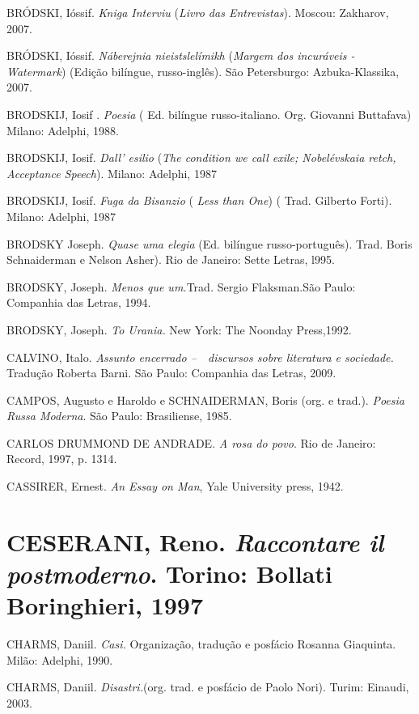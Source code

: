 BRÓDSKI, Ióssif. \emph{Kniga Interviu} (\emph{Livro das Entrevistas}).
Moscou: Zakharov, 2007.

BRÓDSKI, Ióssif. \emph{Náberejnia nieistslelímikh} (\emph{Margem dos
incuráveis - Watermark}) (Edição bilíngue, russo-inglês). São
Petersburgo: Azbuka-Klassika, 2007.

BRODSKIJ, Iosif . \emph{Poesia} ( Ed. bilíngue russo-italiano. Org.
Giovanni Buttafava) Milano: Adelphi, 1988.

BRODSKIJ, Iosif. \emph{Dall' esilio} (\emph{The condition we call exile;
Nobelévskaia retch, Acceptance Speech}). Milano: Adelphi, 1987

BRODSKIJ, Iosif. \emph{Fuga da Bisanzio} ( \emph{Less than One}) ( Trad.
Gilberto Forti). Milano: Adelphi, 1987

BRODSKY Joseph. \emph{Quase uma elegia} (Ed. bilíngue russo-português).
Trad. Boris Schnaiderman e Nelson Asher). Rio de Janeiro: Sette Letras,
l995.

BRODSKY, Joseph. \emph{Menos que um.}Trad\emph{.} Sergio Flaksman.São
Paulo: Companhia das Letras, 1994.

BRODSKY, Joseph. \emph{To Urania.} New York: The Noonday Press,1992.

CALVINO, Italo. \emph{Assunto encerrado --~~discursos sobre literatura e
sociedade.} Tradução Roberta Barni. São Paulo: Companhia das Letras,
2009.

CAMPOS, Augusto e Haroldo e SCHNAIDERMAN, Boris (org. e trad.).
\emph{Poesia Russa Moderna}. São Paulo: Brasiliense, 1985.

CARLOS DRUMMOND DE ANDRADE. \emph{A rosa do povo}. Rio de Janeiro:
Record, 1997, p. 13­14.

CASSIRER, Ernest. \emph{An Essay on Man}, Yale University press, 1942.

\section{\texorpdfstring{CESERANI, Reno. \emph{Raccontare il
postmoderno}. Torino: Bollati Boringhieri,
1997}{CESERANI, Reno. Raccontare il postmoderno. Torino: Bollati Boringhieri, 1997}}\label{ceserani-reno.-raccontare-il-postmoderno.-torino-bollati-boringhieri-1997}

CHARMS, Daniil. \emph{Casi.} Organização, tradução e posfácio Rosanna
Giaquinta. Milão: Adelphi, 1990.

CHARMS, Daniil. \emph{Disastri.}(org. trad. e posfácio de Paolo Nori).
Turim: Einaudi, 2003.

